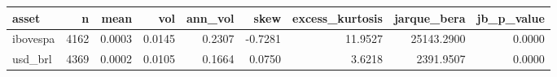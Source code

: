 \begin{tabular}{lrrrrrrrr}
\toprule
asset & n & mean & vol & ann_vol & skew & excess_kurtosis & jarque_bera & jb_p_value \\
\midrule
ibovespa & 4162 & 0.0003 & 0.0145 & 0.2307 & -0.7281 & 11.9527 & 25143.2900 & 0.0000 \\
usd_brl & 4369 & 0.0002 & 0.0105 & 0.1664 & 0.0750 & 3.6218 & 2391.9507 & 0.0000 \\
\bottomrule
\end{tabular}
